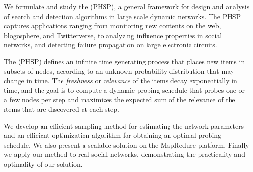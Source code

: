 We formulate and study the {\probname} (PHSP), a general framework for design and analysis of search and detection algorithms in large scale dynamic networks.
The PHSP  captures applications ranging from monitoring new contents on the web,  blogosphere, and Twitterverse, to analyzing influence properties in social networks, and
detecting failure propagation on large electronic circuits.

The {\probname} (PHSP) defines an infinite time generating process that places new items in subsets of nodes, according to an unknown probability distribution that may change in time. The \emph{freshness} or \emph{relevance} of the items decay exponentially in time, and the goal is to compute a dynamic probing schedule that probes one or a few nodes per step and maximizes the expected sum of the relevance of the items that are discovered at each step.

 We develop an efficient sampling method for estimating the network parameters and an efficient optimization algorithm for obtaining an optimal probing schedule. We also present a scalable solution on the MapReduce platform. Finally we apply our method to real social networks, demonstrating the practicality and optimality of our solution. 

